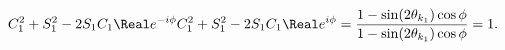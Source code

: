 \begin{enumerate}[(i)]
\begin{dmath}
{ C_1^2 + S_1^2 - 2 S_1 C_1 \Real e^{-i\phi} }
{ C_1^2 + S_1^2 - 2 S_1 C_1 \Real e^{i\phi} }
=
\frac
{ 1 - \sin( 2 \theta_{k_1}) \cos \phi }
{ 1 - \sin( 2 \theta_{k_1}) \cos \phi }
=
1.
\end{dmath}
%
%
\end{enumerate}
